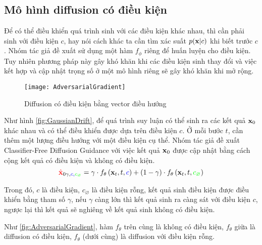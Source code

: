 \subsection{Mô hình diffusion có điều kiện}
\label{subsec:DiffusionCondition}

Để có thể điều khiển quá trình sinh với các điều kiện khác nhau, thì cần phải sinh với điều kiện $c$, hay nói cách khác ta cần tìm xác suất $p(\mathbf{x} | c)$ khi biết trước $c$. Nhóm tác giả \cite{dhariwal2021diffusion} đề xuất sử dụng một hàm $f_{\phi}$ riêng để huấn luyện cho điều kiện. Tuy nhiên phương pháp này gây khó khăn khi các điều kiện sinh thay đổi và việc kết hợp và cập nhật trọng số ở một mô hình riêng sẽ gây khó khăn khi mở rộng.

\begin{figure}[H]
	\captionsetup{skip=20pt}
	\texttt{[image: AdversarialGradient]}
	\caption{Diffusion có điều kiện bằng vector điều hướng}
	\label{fig:AdversarialGradient}
\end{figure}

Như hình \autoref{fig:GaussianDrift}, để quá trình suy luận có thể sinh ra các kết quả $\mathbf{x}_0$ khác nhau và có thể điều khiển được dựa trên điều kiện $c$. Ở mỗi bước $t$, cần thêm một lượng điều hướng với một điều kiện cụ thể. Nhóm tác giả đề xuất  Classifier-Free Diffusion Guidance \cite{ho2022classifier} với việc kết quả $\mathbf{x}_0$ được cập nhật bằng cách cộng kết quả có điều kiện và không có điều kiện.
\begin{equation}
{\color{red}{\hat{\mathbf{x}}}}_{0 \gamma, \color{blue}{c}, \color{green}{c_{\varnothing}}}=\gamma \cdot f_{\theta} \left(\mathbf{x}_{t}, t, {\color{blue}{c}} \right)+(1-\gamma) \cdot f_{\theta} \left(\mathbf{x}_{t}, t, {\color{green}{c_{\varnothing}}} \right)
\end{equation}

Trong đó, $c$ là điều kiện, $c_{\varnothing}$ là điều kiện rỗng,  kết quả sinh điều kiện được điều khiển bằng tham số $\gamma$, nếu $\gamma$ càng lớn thì kết quả sinh ra càng sát với điều kiện $c$, ngược lại thì kết quả sẽ nghiêng về kết quả sinh không có điều kiện.


Như \autoref{fig:AdversarialGradient}, hàm $f_{ \theta}$ trên cùng là không có điều kiện, $f_{ \theta}$ giữa là diffusion có điều kiện, $f_{ \theta}$ (dưới cùng) là diffusion với điều kiện rỗng.